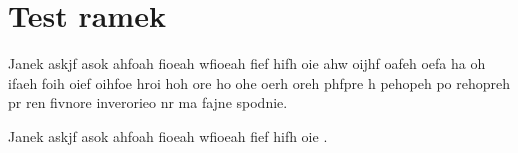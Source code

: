 \documentclass[10pt]{paper}
\begin{document}
\section{Test ramek}


{Janek askjf asok ahfoah fioeah wfioeah fief hifh oie
  ahw oijhf oafeh oefa ha oh
 ifaeh foih oief oihfoe hroi hoh ore ho  ohe oerh oreh
  phfpre h pehopeh po rehopreh pr ren fivnore inverorieo nr
   ma fajne spodnie.}

{Janek askjf asok ahfoah fioeah wfioeah fief hifh oie
  .}

\end{document}
